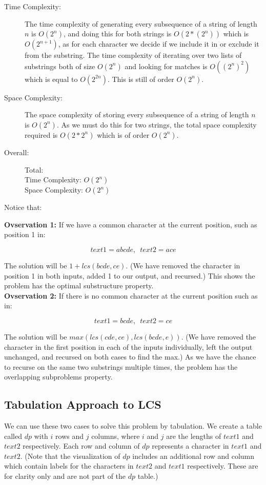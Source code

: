 \begin{description}
    \item[Time Complexity:]
        The time complexity of generating every subsequence of a string of length $n$ is $O(2^n)$,
        and doing this for both strings is $O(2 * (2^n))$ which is $O(2^{n+1})$,
        as for each character we decide if we include it in or exclude it from the substring.
        The time complexity of iterating over two lists of substrings both of size $O(2^n)$ and looking for matches is $O((2^n)^2)$ which is equal to $O(2^{2n})$.
        This is still of order $O(2^n)$.

        
    \item[Space Complexity:]
        The space complexity of storing every subsequence of a string of length $n$ is $O(2^n)$.
        As we must do this for two strings, the total space complexity required is $O(2 * 2^n)$ which is of order $O(2^n)$.

    \item[Overall:] Total:\\
        Time Complexity: $O(2^n)$\\
        Space Complexity: $O(2^n)$
    
\end{description}

Notice that:

\textbf{Ovservation 1:} If we have a common character at the current position, such as position 1 in:

$$text1=abcde,\phantom{0} text2=ace$$

The solution will be $1 + lcs(bcde,ce)$. (We have removed the character in position 1 in both inputs, added 1 to our output, and recursed.)
This shows the problem has the optimal substructure property.\\

\textbf{Ovservation 2:} If there is no common character at the current position such as in:

$$text1=bcde,\phantom{0} text2=ce$$

The solution will be $max(lcs(cde,ce), lcs(bcde,e))$. (We have removed the character in the first position in each of the inputs individually, left the output unchanged, and recursed on both cases to find the max.)
As we have the chance to recurse on the same two substrings multiple times, the problem has the overlapping subproblems property.
\subsection{Tabulation Approach to LCS}
We can use these two cases to solve this problem by tabulation.
We create a table called $dp$ with $i$ rows and $j$ columns, where $i$ and $j$ are the lengths of $text1$ and $text2$ respectively.
Each row and column of $dp$ represents a character in $text1$ and $text2$. (Note that the visualization of $dp$ includes an additional row and column which contain labels for the characters in $text2$ and $text1$ respectively. These are for clarity only and are not part of the $dp$ table.)

